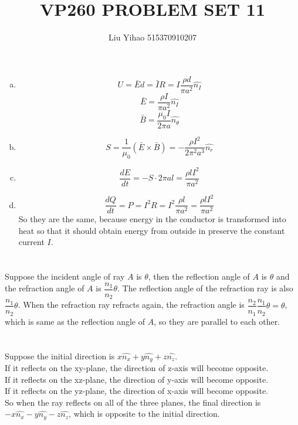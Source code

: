 \documentclass{article}
\title{VP260 PROBLEM SET 11}
\author{Liu Yihao 515370910207}
\date{}
\begin{document}
\maketitle

\section{}
\begin{enumerate}[(a)]
\item
$$U=\bar{E}d=\bar{I}R=I\frac{\rho d}{\pi a^2}\hat{n_I}$$
$$\bar{E}=\frac{\rho I}{\pi a^2}\hat{n_I}$$
$$\bar{B}=\frac{\mu_0I}{2\pi a}\hat{n_\theta}$$
\item
$$S=\frac{1}{\mu_0}(\bar{E}\times\bar{B})=-\frac{\rho I^2}{2\pi^2a^3}\hat{n_r}$$
\item
$$\frac{dE}{dt}=-S\cdot 2\pi al=\frac{\rho lI^2}{\pi a^2}$$
\item
$$\frac{dQ}{dt}=P=I^2R=I^2\frac{\rho l}{\pi a^2}=\frac{\rho lI^2}{\pi a^2}$$
So they are the same, because energy in the conductor is transformed into heat so that it should obtain energy from outside in preserve the constant current $I$.
\end{enumerate}

\section{}
Suppose the incident angle of ray $A$ is $\theta$, then the reflection angle of $A$ is $\theta$ and the refraction angle of $A$ is $\dfrac{n_1}{n_2}\theta$. The reflection angle of the refraction ray is also $\dfrac{n_1}{n_2}\theta$. When the refraction ray refracts again, the refraction angle is $\dfrac{n_2}{n_1}\dfrac{n_1}{n_2}\theta=\theta$, which is same as the reflection angle of $A$, so they are parallel to each other.

\section{}
Suppose the initial direction is $x\hat{n_x}+y\hat{n_y}+z\hat{n_z}$.\\
If it reflects on the xy-plane, the direction of z-axis will become opposite.\\
If it reflects on the xz-plane, the direction of y-axis will become opposite.\\
If it reflects on the yz-plane, the direction of x-axis will become opposite.\\
So when the ray reflects on all of the three planes, the final direction is $-x\hat{n_x}-y\hat{n_y}-z\hat{n_z}$, which is opposite to the initial direction.
\end{document}
